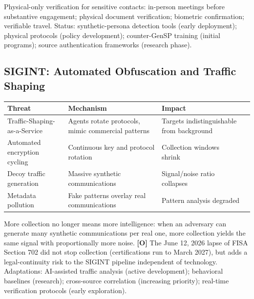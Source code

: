 \documentclass[11pt,letterpaper]{article}
\begin{document}
\begin{keybox}
Physical-only verification for sensitive contacts: in-person meetings before substantive engagement; physical document verification; biometric confirmation; verifiable travel. Status: synthetic-persona detection tools (early deployment); physical protocols (policy development); counter-GenSP training (initial programs); source authentication frameworks (research phase).
\end{keybox}

\subsection{SIGINT: Automated Obfuscation and Traffic Shaping}

\begin{center}
\small
\begin{tabularx}{\linewidth}{ZY{0.92}Y{1.04}Y{1.04}}
\toprule
\textbf{Threat} & \textbf{Mechanism} & \textbf{Impact} \\
\midrule
Traffic-Shaping-as-a-Service & Agents rotate protocols, mimic commercial patterns & Targets indistinguishable from background \\
Automated encryption cycling & Continuous key and protocol rotation & Collection windows shrink \\
Decoy traffic generation & Massive synthetic communications & Signal/noise ratio collapses \\
Metadata pollution & Fake patterns overlay real communications & Pattern analysis degraded \\
\bottomrule
\end{tabularx}
\end{center}

\begin{warnbox}
More collection no longer means more intelligence: when an adversary can generate many synthetic communications per real one, more collection yields the same signal with proportionally more noise. \textbf{[O]} The June 12, 2026 lapse of FISA Section 702 did not stop collection (certifications run to March 2027), but adds a legal-continuity risk to the SIGINT pipeline independent of technology. Adaptations: AI-assisted traffic analysis (active development); behavioral baselines (research); cross-source correlation (increasing priority); real-time verification protocols (early exploration).
\end{warnbox}
\end{document}
